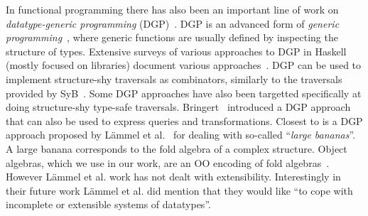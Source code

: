 In functional programming there has also been an important line of
work on \emph{datatype-generic programming} (DGP)~\cite{Gibbons07dgp}.  DGP is an
advanced form of \emph{generic programming}~\cite{GP}, where generic
functions are usually defined by inspecting the structure of
types.  Extensive surveys of various approaches to DGP in Haskell
(mostly focused on libraries) document various
approaches~\cite{ComparingGPHaskellRodriquez,ComparingGPHaskellHinze}.
DGP can be used to implement structure-shy traversals as combinators,
similarly to the traversals provided by SyB~\cite{hinze2003fun}. 
Some DGP approaches have also been targetted specifically at doing 
structure-shy type-safe traversals. Bringert~\cite{bjorn08acf}
introduced a DGP approach that can also be used to express queries 
and transformations. Closest to \name is a DGP approach proposed by 
L\"ammel et al.~\cite{lammel00dealing} for dealing with so-called
``\emph{large bananas}''. A large banana corresponds to the fold
algebra of a complex structure. Object algebras, which we use in our 
work, are an OO encoding of fold algebras~\cite{Oliveira08visitor,bruno12oa}.
However L\"ammel et al. work has not dealt with extensibility. Interestingly 
in their future work  L\"ammel et al. did mention that they would like ``to cope 
with incomplete or extensible systems of datatypes''. 

\begin{comment} 
In that
approach for generalized and basic folds. These fold algebras scale up
applications involving large systems of mutually recursive
datatypes. These works all try to optimize traversal control of large
structures in functional programming paradigm, while our work solves a
similar problem in Object Algebras, a programming style in Object
Oriented Programming paradigm.
\end{comment}

